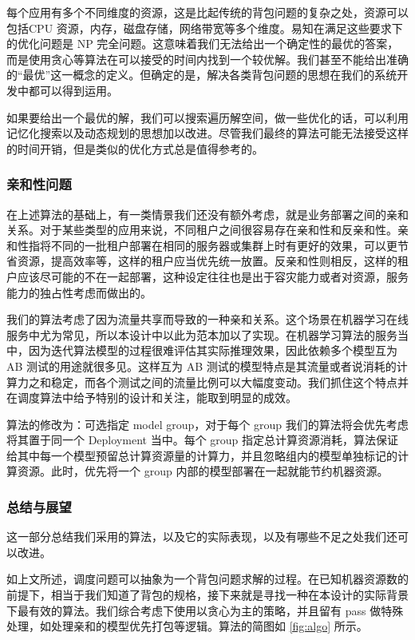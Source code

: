 每个应用有多个不同维度的资源，这是比起传统的背包问题的复杂之处，资源可以包括CPU 资源，内存，磁盘存储，网络带宽等多个维度。易知在满足这些要求下的优化问题是 NP 完全问题。这意味着我们无法给出一个确定性的最优的答案，而是使用贪心等算法在可以接受的时间内找到一个较优解。我们甚至不能给出准确的“最优”这一概念的定义。但确定的是，解决各类背包问题的思想在我们的系统开发中都可以得到运用。

如果要给出一个最优的解，我们可以搜索遍历解空间，做一些优化的话，可以利用记忆化搜索以及动态规划的思想加以改进。尽管我们最终的算法可能无法接受这样的时间开销，但是类似的优化方式总是值得参考的。

\subsubsection{亲和性问题}

在上述算法的基础上，有一类情景我们还没有额外考虑，就是业务部署之间的亲和关系。对于某些类型的应用来说，不同租户之间很容易存在亲和性和反亲和性。亲和性指将不同的一批租户部署在相同的服务器或集群上时有更好的效果，可以更节省资源，提高效率等，这样的租户应当优先统一放置。反亲和性则相反，这样的租户应该尽可能的不在一起部署，这种设定往往也是出于容灾能力或者对资源，服务能力的独占性考虑而做出的。

我们的算法考虑了因为流量共享而导致的一种亲和关系。这个场景在机器学习在线服务中尤为常见，所以本设计中以此为范本加以了实现。在机器学习算法的服务当中，因为迭代算法模型的过程很难评估其实际推理效果，因此依赖多个模型互为 AB 测试的用途就很多见。这样互为 AB 测试的模型特点是其流量或者说消耗的计算力之和稳定，而各个测试之间的流量比例可以大幅度变动。我们抓住这个特点并在调度算法中给予特别的设计和关注，能取到明显的成效。

算法的修改为：可选指定 model group，对于每个 group 我们的算法将会优先考虑将其置于同一个 Deployment 当中。每个 group 指定总计算资源消耗，算法保证给其中每一个模型预留总计算资源量的计算力，并且忽略组内的模型单独标记的计算资源。此时，优先将一个 group 内部的模型部署在一起就能节约机器资源。

\subsubsection{总结与展望}

这一部分总结我们采用的算法，以及它的实际表现，以及有哪些不足之处我们还可以改进。


如上文所述，调度问题可以抽象为一个背包问题求解的过程。在已知机器资源数的前提下，相当于我们知道了背包的规格，接下来就是寻找一种在本设计的实际背景下最有效的算法。我们综合考虑下使用以贪心为主的策略，并且留有 pass 做特殊处理，如处理亲和的模型优先打包等逻辑。算法的简图如 \ref{fig:algo} 所示。

